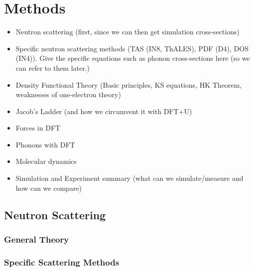\newcommand{\jp}{j^\prime}
\newcommand{\jpp}{j^{\prime\prime}}
\newcommand{\lp}{l^\prime}
\newcommand{\lpp}{l^{\prime\prime}}
\newcommand{\fc}{\bm{\Phi}\genfrac{(}{)}{0pt}{}{j \jp}{l \lp}}
\newcommand{\fczero}{\bm{\Phi}\genfrac{(}{)}{0pt}{}{j \jp}{0 \lp}}
\newcommand{\fcb}{\bm{\Theta}\genfrac{(}{)}{0pt}{}{j \jp}{l \lp}}
\newcommand{\fcbpp}{\bm{\Theta}\genfrac{(}{)}{0pt}{}{j \jpp}{l \lpp}}
\newcommand{\fcbf}{-\bm{\Theta}\genfrac{(}{)}{0pt}{}{j \jp}{l \lp} + \delta_{j,\jp} \delta_{l,\lp} \sum_{\jpp, \lpp}  \bm{\Theta}\genfrac{(}{)}{0pt}{}{j \jpp}{l \lpp} }
\newcommand*\tageq{\refstepcounter{equation}\tag{\theequation}}

\chapter{Methods}\label{ch:method}

\begin{framed}
	\begin{itemize}
		\item Neutron scattering (first, since we can then get simulation cross-sections)
		\item Specific neutron scattering methods (TAS (IN8, ThALES), PDF (D4), DOS (IN4)). Give the specific equations such as phonon cross-sections here (so we can refer to them later.)
		\item Density Functional Theory (Basic principles, KS equations, HK Theorem, weaknesses of one-electron theory)
		\item Jacob's Ladder (and how we circumvent it with DFT+U)
		\item Forces in DFT
		\item Phonons with DFT
		\item Molecular dynamics
		\item Simulation and Experiment summary (what can we simulate/measure and how can we compare)
	\end{itemize}	
\end{framed}

\section{Neutron Scattering}

\subsection{General Theory}

\subsection{Specific Scattering Methods}

